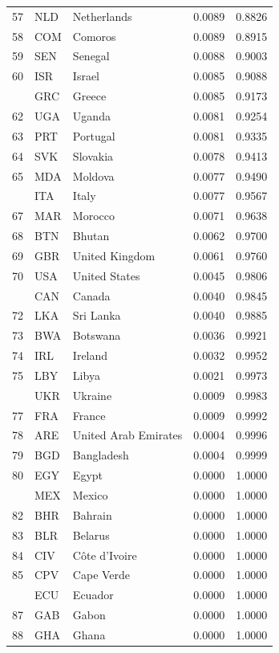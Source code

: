 \documentclass[referee,pdflatex,sn-basic]{sn-jnl}
\theoremstyle{thmstylethree}
\begin{document}
\begin{ThreePartTable}
\begin{longtable}[t]{rllrr}
57 & NLD & Netherlands & 0.0089 & 0.8826\\
58 & COM & Comoros & 0.0089 & 0.8915\\
59 & SEN & Senegal & 0.0088 & 0.9003\\
60 & ISR & Israel & 0.0085 & 0.9088\\
\addlinespace
61 & GRC & Greece & 0.0085 & 0.9173\\
62 & UGA & Uganda & 0.0081 & 0.9254\\
63 & PRT & Portugal & 0.0081 & 0.9335\\
64 & SVK & Slovakia & 0.0078 & 0.9413\\
65 & MDA & Moldova & 0.0077 & 0.9490\\
\addlinespace
66 & ITA & Italy & 0.0077 & 0.9567\\
67 & MAR & Morocco & 0.0071 & 0.9638\\
68 & BTN & Bhutan & 0.0062 & 0.9700\\
69 & GBR & United Kingdom & 0.0061 & 0.9760\\
70 & USA & United States & 0.0045 & 0.9806\\
\addlinespace
71 & CAN & Canada & 0.0040 & 0.9845\\
72 & LKA & Sri Lanka & 0.0040 & 0.9885\\
73 & BWA & Botswana & 0.0036 & 0.9921\\
74 & IRL & Ireland & 0.0032 & 0.9952\\
75 & LBY & Libya & 0.0021 & 0.9973\\
\addlinespace
76 & UKR & Ukraine & 0.0009 & 0.9983\\
77 & FRA & France & 0.0009 & 0.9992\\
78 & ARE & United Arab Emirates & 0.0004 & 0.9996\\
79 & BGD & Bangladesh & 0.0004 & 0.9999\\
80 & EGY & Egypt & 0.0000 & 1.0000\\
\addlinespace
81 & MEX & Mexico & 0.0000 & 1.0000\\
82 & BHR & Bahrain & 0.0000 & 1.0000\\
83 & BLR & Belarus & 0.0000 & 1.0000\\
84 & CIV & Côte d’Ivoire & 0.0000 & 1.0000\\
85 & CPV & Cape Verde & 0.0000 & 1.0000\\
\addlinespace
86 & ECU & Ecuador & 0.0000 & 1.0000\\
87 & GAB & Gabon & 0.0000 & 1.0000\\
88 & GHA & Ghana & 0.0000 & 1.0000\\

\end{longtable}
\end{ThreePartTable}
\end{document}
